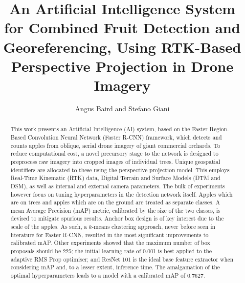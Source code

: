 \documentclass[journal]{IEEEtran}
\title{\fontsize{23.9}{27}\selectfont An Artificial Intelligence System for Combined Fruit Detection and Georeferencing, Using RTK-Based Perspective Projection in Drone Imagery}
\date{}
\begin{document}
\author{Angus Baird and Stefano Giani}


\IEEEaftertitletext{\vspace{-1\baselineskip}}

\maketitle







\fontsize{9.5}{11.14}\selectfont






\begin{abstract}


This work presents an Artificial Intelligence (AI) system, based on the Faster Region-Based Convolution Neural Network (Faster R-CNN) framework, which detects and counts apples from oblique, aerial drone imagery of giant commercial orchards. To reduce computational cost, a novel precursory stage to the network is designed to preprocess raw imagery into cropped images of individual trees. Unique geospatial identifiers are allocated to these using the perspective projection model. This employs Real-Time Kinematic (RTK) data, Digital Terrain and Surface Models (DTM and DSM), as well as internal and external camera parameters. The bulk of experiments however focus on tuning hyperparameters in the detection network itself. Apples which are on trees and apples which are on the ground are treated as separate classes. A mean Average Precision (mAP) metric, calibrated by the size of the two classes, is devised to mitigate spurious results. Anchor box design is of key interest due to the scale of the apples. As such, a \textbf{$k$}-means clustering approach, never before seen in literature for Faster R-CNN, resulted in the most significant improvements to calibrated mAP. Other experiments showed that the maximum number of box proposals should be 225; the initial learning rate of 0.001 is best applied to the adaptive RMS Prop optimiser; and ResNet 101 is the ideal base feature extractor when considering mAP and, to a lesser extent, inference time. The amalgamation of the optimal hyperparameters leads to a model with a calibrated mAP of 0.7627.




\end{abstract}
\end{document}
